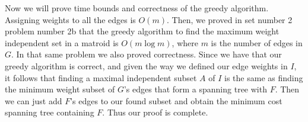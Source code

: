 \documentclass{article}
\begin{document}
\begin{description}
        Now we will prove time bounds and correctness of the greedy algorithm.
        Assigning weights to all the edges is $O(m)$. Then, we proved in set
        number 2 problem number 2b that the greedy algorithm to find the maximum weight
        independent set in a matroid is $O(m \log m)$, where $m$ is the number
        of edges in $G$. In that same problem we also proved correctness. Since
        we have that our greedy algorithm is correct, and given the way we
        defined our edge weights in $I$, it follows that finding a
        maximal independent subset $A$ of $I$ is the same as finding the minimum
        weight subset of $G$'s edges that form a spanning tree with $F$. Then we
        can just add $F$'s edges to our found subset and obtain the minimum cost
        spanning tree containing $F$. Thus our proof is complete.
\end{description}
\newpage

\end{document}
